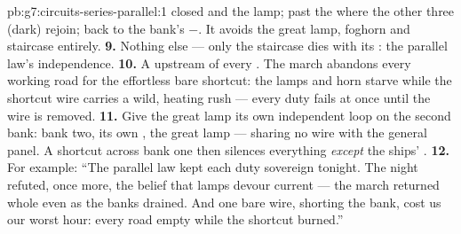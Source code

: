 \begin{solution}{pb:g7:circuits-series-parallel:1}
closed  and the lamp; past the  where the other
three (dark)  rejoin; back to the bank's $-$. It avoids
the great lamp, foghorn and staircase  entirely.
\textbf{9.} Nothing else --- only the staircase  dies with
its : the parallel law's independence.
\textbf{10.} A  upstream of every . The march
abandons every working road for the effortless bare shortcut:
the lamps and horn starve while the shortcut wire carries a
wild, heating rush --- every duty fails at once until the wire
is removed.
\textbf{11.} Give the great lamp its own independent loop on the
second bank: bank two, its own , the great lamp --- sharing
no wire with the general panel. A shortcut across bank one then
silences everything \emph{except} the ships' .
\textbf{12.} For example: ``The parallel law kept each duty
sovereign tonight. The night refuted, once more, the belief that
lamps devour current --- the march returned whole even as the
banks drained. And one bare wire, shorting the bank, cost us our
worst hour: every road empty while the shortcut burned.''
\end{solution}
